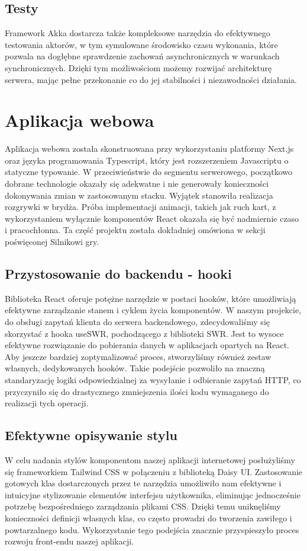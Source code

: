 \subsection{Testy}
Framework Akka dostarcza także kompleksowe narzędzia do efektywnego testowania aktorów, w tym symulowane środowisko czasu wykonania, które pozwala na dogłębne sprawdzenie zachowań asynchronicznych w warunkach synchronicznych. Dzięki tym możliwościom możemy rozwijać architekturę serwera, mając pełne przekonanie co do jej stabilności i niezawodności działania.

\section{Aplikacja webowa}
Aplikacja webowa została skonstruowana przy wykorzystaniu platformy Next.js oraz języka programowania Typescript, który jest rozszerzeniem Javascriptu o statyczne typowanie. W przeciwieństwie do segmentu serwerowego, początkowo dobrane technologie okazały się adekwatne i nie generowały konieczności dokonywania zmian w zastosowanym stacku. Wyjątek stanowiła realizacja rozgrywki w brydża. Próba implementacji animacji, takich jak ruch kart, z wykorzystaniem wyłącznie komponentów React okazała się być nadmiernie czaso i pracochłonna. Ta część projektu została dokładniej omówiona w sekcji poświęconej Silnikowi gry.

\subsection{Przystosowanie do backendu - hooki}
Biblioteka React oferuje potężne narzędzie w postaci hooków, które umożliwiają efektywne zarządzanie stanem i cyklem życia komponentów. W naszym projekcie, do obsługi zapytań klienta do serwera backendowego, zdecydowaliśmy się skorzystać z hooka useSWR, pochodzącego z biblioteki SWR. Jest to wysoce efektywne rozwiązanie do pobierania danych w aplikacjach opartych na React. Aby jeszcze bardziej zoptymalizować proces, stworzyliśmy również zestaw własnych, dedykowanych hooków. Takie podejście pozwoliło na znaczną standaryzację logiki odpowiedzialnej za wysyłanie i odbieranie zapytań HTTP, co przyczyniło się do drastycznego zmniejszenia ilości kodu wymaganego do realizacji tych operacji.
\subsection{Efektywne opisywanie stylu}
W celu nadania stylów komponentom naszej aplikacji internetowej posłużyliśmy się frameworkiem Tailwind CSS w połączeniu z biblioteką Daisy UI. Zastosowanie gotowych klas dostarczonych przez te narzędzia umożliwiło nam efektywne i intuicyjne stylizowanie elementów interfejsu użytkownika, eliminując jednocześnie potrzebę bezpośredniego zarządzania plikami CSS. Dzięki temu uniknęliśmy konieczności definicji własnych klas, co często prowadzi do tworzenia zawiłego i powtarzalnego kodu. Wykorzystanie tego podejścia znacznie przyspieszyło proces rozwoju front-endu naszej aplikacji.
